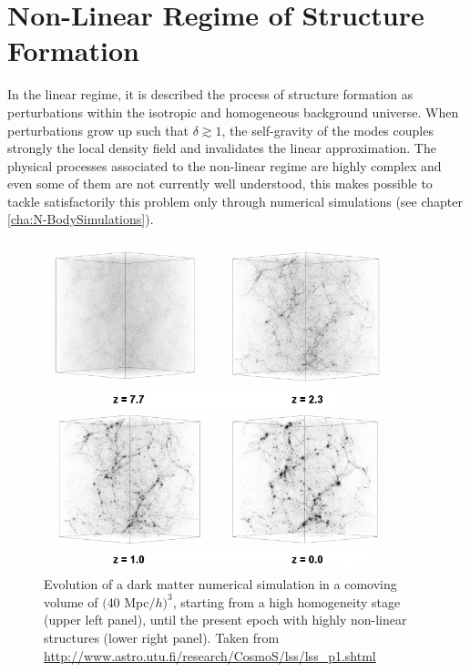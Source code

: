



\section{Non-Linear Regime of Structure Formation}
\label{sec:NonLinearStructureFormation}


In the linear regime, it is described the process of structure formation
as perturbations within the isotropic and homogeneous background universe.
When perturbations grow up such that $\delta \gtrsim 1$, the self-gravity 
of the modes couples strongly the local density field and invalidates
the linear approximation. The physical processes associated to the 
non-linear regime are highly complex and even some of them are not 
currently well understood, this makes possible to tackle satisfactorily
this problem only through numerical simulations (see chapter
\ref{cha:N-BodySimulations}).


\begin{figure}[htbp]
	\centering
	\includegraphics[width=0.9\textwidth]
	{./figures/2_theoretical_framework/Nonlinear.png}

	\caption{\small{Evolution of a dark matter numerical simulation in a 
	comoving volume of $($40 Mpc$/h)^3$, starting from a high homogeneity 
	stage (upper left panel), until the present epoch with highly 
	non-linear structures (lower right panel). Taken from 
	\url{http://www.astro.utu.fi/research/CosmoS/lss/lss_p1.shtml}}}
	
	\label{fig:NonLinearUniverse}
\end{figure}


